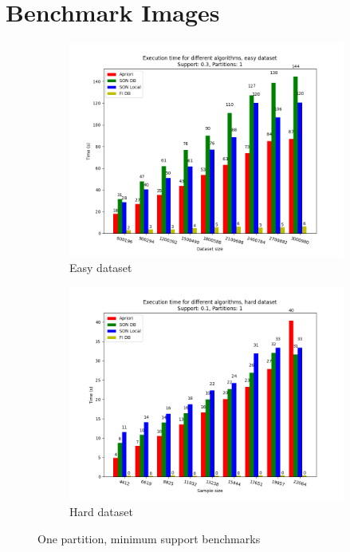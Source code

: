 \documentclass[a4paper]{article}
\begin{document}
	\newpage
	\section{Benchmark Images}

	\begin{figure}[h!]
		\centering
		\begin{subfigure}[b]{\textwidth}
			\centering
			\includegraphics[width=.9\textwidth]{1_easy_0,3_1_dataset.png}
         	\caption{Easy dataset}
		\end{subfigure}
		\begin{subfigure}[b]{\textwidth}
			\centering
			\includegraphics[width=.9\textwidth]{1_hard_0,1_1_dataset.png}
         	\caption{Hard dataset}
		\end{subfigure}

		\caption{One partition, minimum support benchmarks}
		\label{fig:1par-minsup}
		
	\end{figure}
	
\end{document}
